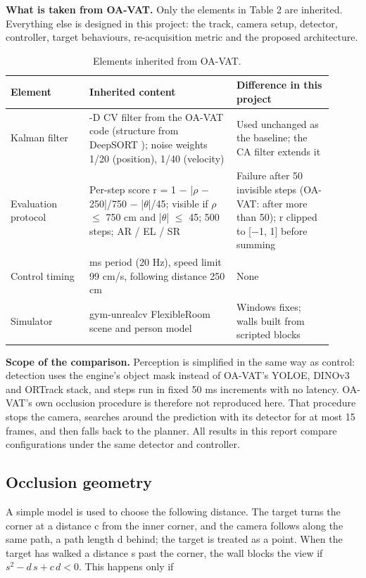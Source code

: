 \documentclass[12pt,a4paper]{article}
\begin{document}
\textbf{What is taken from OA-VAT.} Only the elements in Table 2 are inherited. Everything else is designed in this project: the track, camera setup, detector, controller, target behaviours, re-acquisition metric and the proposed architecture.

\begin{table}[htbp]
  \centering
  \small
  \caption{Elements inherited from OA-VAT.}
  \renewcommand{\arraystretch}{1.15}
  \begin{tabular}{>{\raggedright\arraybackslash}p{0.223\linewidth}>{\raggedright\arraybackslash}p{0.416\linewidth}>{\raggedright\arraybackslash}p{0.271\linewidth}}
  \toprule
  \textbf{Element} & \textbf{Inherited content} & \textbf{Difference in this project} \\
  \midrule
  Kalman filter & 8-D CV filter from the OA-VAT code (structure from DeepSORT \cite{r20}); noise weights 1/20 (position), 1/40 (velocity) & Used unchanged as the baseline; the CA filter extends it \\
  Evaluation protocol & Per-step score r = 1 $-$ |$\rho$ $-$ 250|/750 $-$ |$\theta$|/45; visible if $\rho$ $\le$ 750 cm and |$\theta$| $\le$ 45\textdegree{}; 500 steps; AR / EL / SR & Failure after 50 invisible steps (OA-VAT: after more than 50); r clipped to [$-$1, 1] before summing \\
  Control timing & 50 ms period (20 Hz), speed limit 99 cm/s, following distance 250 cm & None \\
  Simulator & gym-unrealcv FlexibleRoom scene and person model & Windows fixes; walls built from scripted blocks \\
  \bottomrule
  \end{tabular}
\end{table}

\textbf{Scope of the comparison.} Perception is simplified in the same way as control: detection uses the engine’s object mask instead of OA-VAT’s YOLOE, DINOv3 and ORTrack stack, and steps run in fixed 50 ms increments with no latency. OA-VAT’s own occlusion procedure is therefore not reproduced here. That procedure stops the camera, searches around the prediction with its detector for at most 15 frames, and then falls back to the planner. All results in this report compare configurations under the same detector and controller.


\subsection{Occlusion geometry}
A simple model is used to choose the following distance. The target turns the corner at a distance c from the inner corner, and the camera follows along the same path, a path length d behind; the target is treated as a point. When the target has walked a distance s past the corner, the wall blocks the view if $s^2 - d\,s + c\,d < 0$. This happens only if
\end{document}

